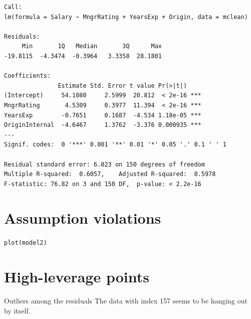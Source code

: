 \documentclass{beamer}\usepackage[]{graphicx}\usepackage[]{color}
\makeatletter
\newcommand{\hlstd}[1]{\textcolor[rgb]{1,0.894,0.769}{#1}}%
\newcommand{\hlkwd}[1]{\textcolor[rgb]{1,0.78,0.769}{#1}}%
\newenvironment{kframe}{%
 \def\at@end@of@kframe{}%
 \ifinner\ifhmode%
  \def\at@end@of@kframe{\end{minipage}}%
  \begin{minipage}{\columnwidth}%
 \fi\fi%
 \def\FrameCommand##1{\hskip\@totalleftmargin \hskip-\fboxsep
 \colorbox{shadecolor}{##1}\hskip-\fboxsep
     \hskip-\linewidth \hskip-\@totalleftmargin \hskip\columnwidth}%
 \MakeFramed {\advance\hsize-\width
   \@totalleftmargin\z@ \linewidth\hsize
   \@setminipage}}%
 {\par\unskip\endMakeFramed%
 \at@end@of@kframe}
\newenvironment{knitrout}{}{} %
\makeatother
\begin{document}
\begin{darkframes}
\begin{frame}[fragile]
\begin{knitrout}
\begin{kframe}
\begin{verbatim}
Call:
lm(formula = Salary ~ MngrRating + YearsExp + Origin, data = mclean)

Residuals:
     Min       1Q   Median       3Q      Max 
-19.8115  -4.3474  -0.3964   3.3358  28.1801 

Coefficients:
               Estimate Std. Error t value Pr(>|t|)    
(Intercept)     54.1080     2.5999  20.812  < 2e-16 ***
MngrRating       4.5309     0.3977  11.394  < 2e-16 ***
YearsExp        -0.7651     0.1687  -4.534 1.18e-05 ***
OriginInternal  -4.6467     1.3762  -3.376 0.000935 ***
---
Signif. codes:  0 '***' 0.001 '**' 0.01 '*' 0.05 '.' 0.1 ' ' 1

Residual standard error: 6.823 on 150 degrees of freedom
Multiple R-squared:  0.6057,	Adjusted R-squared:  0.5978 
F-statistic: 76.82 on 3 and 150 DF,  p-value: < 2.2e-16
\end{verbatim}
\end{kframe}
\end{knitrout}
    \end{frame}
    
    \section{Assumption violations}
    
    \begin{frame}[fragile]
      \fontsize{9}{9}\selectfont

\begin{knitrout}
\begin{kframe}
\begin{alltt}
\hlkwd{plot}\hlstd{(model2)}
\end{alltt}
\end{kframe}


\end{knitrout}

    \end{frame}
    
    \section{High-leverage points}
    
    \begin{frame}[fragile]{Outliers among the residuals}  
      The data with index 157 seems to be hanging out by itself. \pause \bigskip
      

\end{frame}
\end{darkframes}
\end{document}
